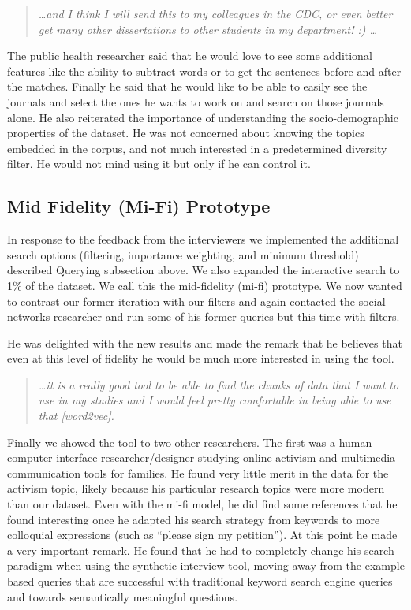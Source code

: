 \documentclass{sigchi}
\begin{document}
\begin{quote}
{\em
\dots and I think I will send this to my colleagues in the CDC, or even better get many other dissertations to other students in my department! :) \dots
}\end{quote}

The public health researcher said that he would love to see some additional features like the ability to subtract words or to get the sentences before and after the matches. Finally he said that he would like to be able to easily see the journals and select the ones he wants to work on and search on those journals alone. He also reiterated the importance of understanding the socio-demographic properties of the dataset. He was not concerned about knowing the topics embedded in the corpus, and not much interested in a predetermined diversity filter. He would not mind using it but only if he can control it.

\subsection{Mid Fidelity (Mi-Fi) Prototype}
In response to the feedback from the interviewers we implemented the additional search options (filtering, importance weighting, and minimum threshold) described Querying subsection above. We also expanded the interactive search to 1\% of the dataset. We call this the mid-fidelity (mi-fi) prototype. We now wanted to contrast our former iteration with our filters and again contacted the social networks researcher and run some of his former queries but this time with filters. 

He was delighted with the new results and made the remark that he believes that even at this level of fidelity he would be much more interested in using the tool.
\begin{quote}
{\em
\dots it is a really good tool to be able to find the chunks of data that I want to use in my studies and I would feel pretty comfortable in being able to use that [word2vec].}
\end{quote}

Finally we showed the tool to two other researchers. The first was a human computer interface researcher/designer studying online activism and multimedia communication tools for families. He found very little merit in the data for the activism topic, likely because his particular research topics were more modern than our dataset. Even with the mi-fi model, he did find some references that he found interesting once he adapted his search strategy from keywords to more colloquial expressions (such as ``please sign my petition''). At this point he made a very important remark. He found that he had to completely change his search paradigm when using the synthetic interview tool, moving away from the example based queries that are successful with traditional keyword search engine queries and towards semantically meaningful questions. 
\end{document}

